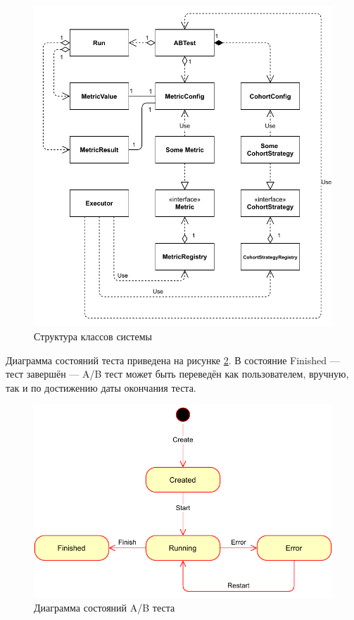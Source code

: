 \documentclass[../document.tex]{subfiles}
\begin{document}
	\begin{figure}[h]
		\centering
		\includegraphics{class_diagram.pdf}
		\caption{\label{image:class_plot}Структура классов системы}
	\end{figure}
	\par Диаграмма состояний теста приведена на рисунке \ref{image:test_state_plot}. В состояние Finished --- тест завершён --- A/B тест может быть переведён как пользователем, вручную, так и по достижению даты окончания теста.
	\begin{figure}[h]
		\centering
		\includegraphics{state_diagram.pdf}
		\caption{\label{image:test_state_plot}Диаграмма состояний A/B теста}
	\end{figure}
\end{document}
